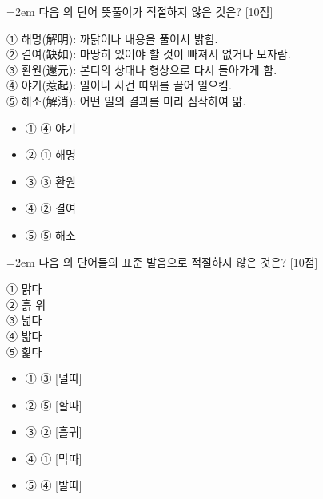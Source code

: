 \documentclass[10pt,a4paper]{article}
\newcommand{\qnum}[1]{%
  \tikz[baseline=(num.base)]{%
    \node[circle, fill=numCircle, text=white, inner sep=0pt,
          minimum size=18pt, font=\small\bfseries] (num) {#1};%
  }%
}
\newcommand{\pts}[1]{%
  \hfill\textcolor{ptsBadge}{[#1점]}%
}
\begin{document}
\vspace{4mm}
\begin{minipage}{\columnwidth}
{\hangindent=2em
\qnum{27}\enspace 다음 의 단어 뜻풀이가 적절하지 않은 것은? \pts{10}
\par}

\vspace{3mm}
\begin{tcolorbox}[bogi]
① 해명(解明): 까닭이나 내용을 풀어서 밝힘. \\{}
② 결여(缺如): 마땅히 있어야 할 것이 빠져서 없거나 모자람. \\{}
③ 환원(還元): 본디의 상태나 형상으로 다시 돌아가게 함. \\{}
④ 야기(惹起): 일이나 사건 따위를 끌어 일으킴. \\{}
⑤ 해소(解消): 어떤 일의 결과를 미리 짐작하여 앎.
\end{tcolorbox}
\vspace{3mm}
\begin{itemize}[leftmargin=2.5em, labelsep=0.3em, label={}, itemsep=4pt, parsep=1pt, topsep=0pt]
  \item ① ④ 야기
  \item ② ① 해명
  \item ③ ③ 환원
  \item ④ ② 결여
  \item ⑤ ⑤ 해소
\end{itemize}
\end{minipage}
\vspace{4mm}

\vspace{4mm}
\begin{minipage}{\columnwidth}
{\hangindent=2em
\qnum{28}\enspace 다음 의 단어들의 표준 발음으로 적절하지 않은 것은? \pts{10}
\par}

\vspace{3mm}
\begin{tcolorbox}[bogi]
① 맑다 \\{}
② 흙 위 \\{}
③ 넓다 \\{}
④ 밟다 \\{}
⑤ 핥다
\end{tcolorbox}
\vspace{3mm}
\begin{itemize}[leftmargin=2.5em, labelsep=0.3em, label={}, itemsep=4pt, parsep=1pt, topsep=0pt]
  \item ① ③ [널따]
  \item ② ⑤ [할따]
  \item ③ ② [흘귀]
  \item ④ ① [막따]
  \item ⑤ ④ [발따]
\end{itemize}
\end{minipage}
\vspace{4mm}
\end{document}
